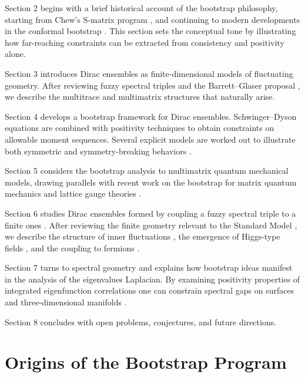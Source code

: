 \documentclass[11pt]{article}
\theoremstyle{plain}
\begin{document}
Section 2 begins with a brief historical account of the bootstrap philosophy, starting from Chew’s S-matrix program \cite{Chew1962}, and continuing to modern developments in the conformal bootstrap \cite{RRTV}. This section sets the conceptual tone by illustrating how far-reaching constraints can be extracted from consistency and positivity alone.


Section 3 introduces Dirac ensembles as finite-dimensional models of fluctuating geometry. After reviewing fuzzy spectral triples and the Barrett--Glaser proposal \cite{Barrett2015, Barrett2016, glaser}, we describe the multitrace and multimatrix structures that naturally arise. 

Section 4 develops a bootstrap framework for Dirac ensembles. Schwinger--Dyson equations are combined with positivity techniques \cite{bootstraps, bootstraps berenstein} to obtain constraints on allowable moment sequences. Several explicit models are worked out to illustrate both symmetric and symmetry-breaking behaviors \cite{hessam2022bootstrapping, hessam2022fromnoncom}.

Section 5 considers the bootstrap analysis to multimatrix quantum mechanical models, drawing parallels with recent work on the bootstrap for matrix quantum mechanics and lattice gauge theories \cite{bootstraps matrix quantum mechancis cho, bootstraps Guo lattice yang-mills, LinZheng2025}.

Section 6 studies Dirac ensembles formed by coupling a fuzzy spectral triple to a finite ones \cite{Connes-Lott, Sanchez Yang-Mills}. After reviewing the finite geometry relevant to the Standard Model \cite{Neutrino Mixing, VS}, we describe the structure of inner fluctuations \cite{Connes Inner Fluctuations}, the emergence of Higgs-type fields \cite{Spectral action, Sanchez Yang-Mills}, and the coupling to fermions \cite{Barrett2024, Khalkhali2025 large N limit}.

Section 7 turns to spectral geometry and explains how bootstrap ideas manifest in the analysis of the eigenvalues Laplacian. By examining positivity properties of integrated eigenfunction correlations  one can constrain spectral gaps on surfaces and three-dimensional manifolds \cite{Bon1, Bon2}.


Section 8 concludes with open problems, conjectures, and future directions.



\section{Origins of the Bootstrap Program}
\label{sec:bootstrap-origins}
\end{document}
